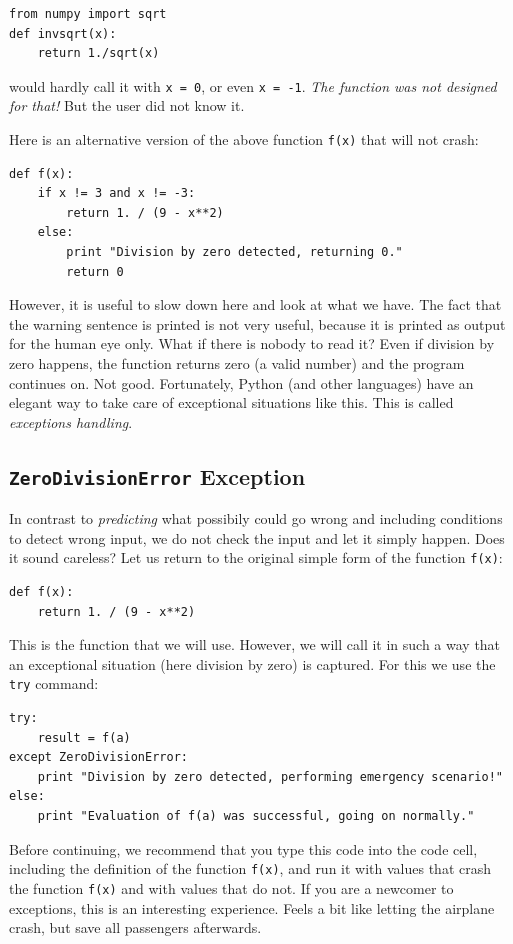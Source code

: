 \begin{verbatim}
from numpy import sqrt
def invsqrt(x):
    return 1./sqrt(x)
\end{verbatim}
would hardly call it with {\tt x = 0}, or even {\tt x = -1}. {\em The function 
was not designed for that!} But the user did not know it.

Here is an alternative version of the above function {\tt f(x)} that will not crash:

\begin{verbatim}
def f(x):
    if x != 3 and x != -3:
        return 1. / (9 - x**2)
    else:
        print "Division by zero detected, returning 0."
        return 0
\end{verbatim}
However, it is useful to slow down here and look at what we have. The fact that
the warning sentence is printed is not very useful, because it is printed as output for 
the human eye only. What if there is nobody to read it? Even if division by zero 
happens, the function returns zero (a valid number) and the program continues on.
Not good. Fortunately,
Python (and other languages) have an elegant way to take care of exceptional situations 
like this. This is called {\em exceptions handling}.

\subsection{{\tt ZeroDivisionError} Exception}

In contrast 
to {\em predicting} what possibily could go wrong and including conditions to detect wrong 
input, we do not check the input and let it simply happen. Does it sound careless? Let us 
return to the original simple form of the function {\tt f(x)}:

\begin{verbatim}
def f(x):
    return 1. / (9 - x**2)
\end{verbatim}
This is the function that we will use. However, we will call it in such a way that 
an exceptional situation (here division by zero) is captured. For this we use the 
{\tt try} command:
 
\begin{verbatim}
try:
    result = f(a)
except ZeroDivisionError:
    print "Division by zero detected, performing emergency scenario!"
else:
    print "Evaluation of f(a) was successful, going on normally."
\end{verbatim}
Before continuing, we recommend that you type this code into the code cell,
including the definition of the function {\tt f(x)}, and run it with values
that crash the function {\tt f(x)} and with values that do not. If you are a newcomer to
exceptions, this is an interesting experience. Feels a bit like letting the
airplane crash, but save all passengers afterwards.
 
